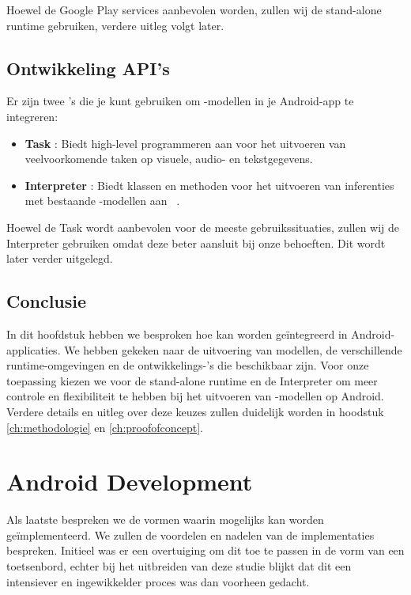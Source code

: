 Hoewel de Google Play services aanbevolen worden, zullen wij de stand-alone  runtime gebruiken, verdere uitleg volgt later.

\subsection{Ontwikkeling API's}

Er zijn twee 's die je kunt gebruiken om -modellen in je Android-app te integreren:

\begin{itemize}
    \item \textbf{ Task }: Biedt high-level programmeren aan voor het uitvoeren van veelvoorkomende  taken op visuele, audio- en tekstgegevens. 
    \item \textbf{ Interpreter }: Biedt klassen en methoden voor het uitvoeren van inferenties met bestaande -modellen aan ~\autocite{TensorFlowLite2024Android}.
\end{itemize}

Hoewel de Task  wordt aanbevolen voor de meeste gebruikssituaties, zullen wij de Interpreter  gebruiken omdat deze beter aansluit bij onze behoeften. Dit wordt later verder uitgelegd.

\subsection{Conclusie}

In dit hoofdstuk hebben we besproken hoe  kan worden geïntegreerd in Android-applicaties. We hebben gekeken naar de uitvoering van modellen, de verschillende runtime-omgevingen en de ontwikkelings-'s die beschikbaar zijn. Voor onze toepassing kiezen we voor de stand-alone  runtime en de Interpreter  om meer controle en flexibiliteit te hebben bij het uitvoeren van -modellen op Android. Verdere details en uitleg over deze keuzes zullen duidelijk worden in hoodstuk \ref{ch:methodologie} en \ref{ch:proofofconcept}.

\section{Android Development}

Als laatste bespreken we de vormen waarin  mogelijks kan worden geïmplementeerd. We zullen de voordelen en nadelen van de implementaties bespreken. Initieel was er een overtuiging om dit toe te passen in de vorm van een toetsenbord, echter bij het uitbreiden van deze studie blijkt dat dit een intensiever en ingewikkelder proces was dan voorheen gedacht.

